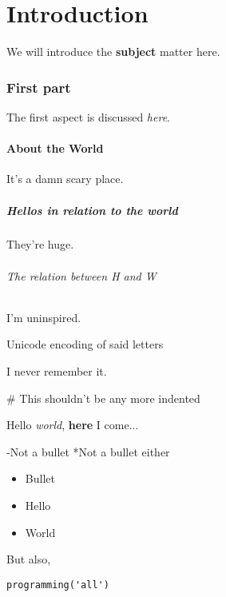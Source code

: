 \documentclass{article}
\begin{document}
\part*{Introduction}

We will introduce the \textbf{subject} matter here.

\section*{First part}

The first aspect is discussed \textit{here}.

\subsection*{About the World}

It's a damn scary place.

\subsubsection*{Hellos in relation to the world}

They're huge.

\paragraph{The relation between H and W}\mbox{}\newline

I'm uninspired.

\subparagraph{Unicode encoding of said letters}\mbox{}\newline

I never remember it.

\subparagraph{\# This shouldn't be any more indented}\mbox{}\newline

Hello \textit{world}, \textbf{here} I come...

-Not a bullet
*Not a bullet either

\begin{itemize}
\item  Bullet
\item  Hello
\item  World

\end{itemize}

But also,


\begin{verbatim}
programming('all')
\end{verbatim}
\end{document}
